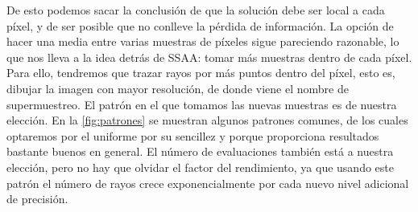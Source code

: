 De esto podemos sacar la conclusión de que la solución debe ser local a cada píxel, y de ser posible que no conlleve la pérdida de información. La opción de hacer una media entre varias muestras de píxeles sigue pareciendo razonable, lo que nos lleva a la idea detrás de SSAA: tomar más muestras dentro de cada píxel. Para ello, tendremos que trazar rayos por más puntos dentro del píxel, esto es, dibujar la imagen con mayor resolución, de donde viene el nombre de supermuestreo. El patrón en el que tomamos las nuevas muestras es de nuestra elección. En la \autoref{fig:patrones} se muestran algunos patrones comunes, de los cuales optaremos por el uniforme por su sencillez y porque proporciona resultados bastante buenos en general. El número de evaluaciones también está a nuestra elección, pero no hay que olvidar el factor del rendimiento, ya que usando este patrón el número de rayos crece exponencialmente por cada nuevo nivel adicional de precisión.
\newline


